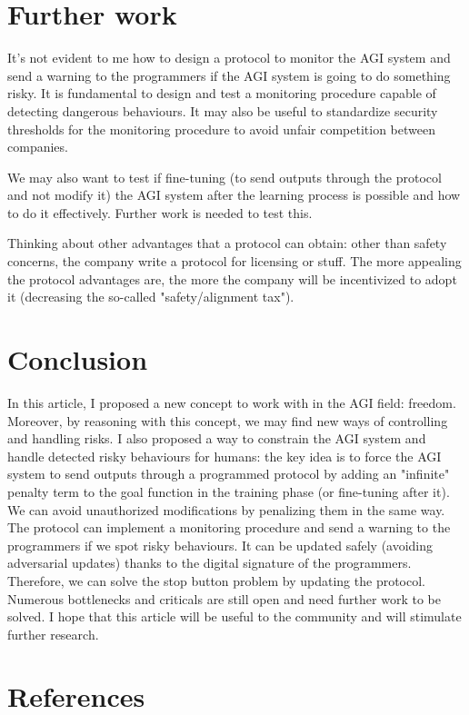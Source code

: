 \documentclass{article}
\begin{document}
\section{Further work}
It's not evident to me how to design a protocol to monitor the AGI system and send a warning to the programmers if the AGI system is going to do something risky. 
It is fundamental to design and test a monitoring procedure capable of detecting dangerous behaviours.
It may also be useful to standardize security thresholds for the monitoring procedure to avoid unfair competition between companies.

We may also want to test if fine-tuning (to send outputs through the protocol and not modify it) the AGI system after the learning process is possible and how to do it effectively. Further work is needed to test this.

Thinking about other advantages that a protocol can obtain: other than safety concerns, the company write a protocol for licensing or stuff. 
The more appealing the protocol advantages are, the more the company will be incentivized to adopt it (decreasing the so-called "safety/alignment tax").

\section{Conclusion}
In this article, I proposed a new concept to work with in the AGI field: freedom. Moreover, by reasoning with this concept, we may find new ways of controlling and handling risks.
I also proposed a way to constrain the AGI system and handle detected risky behaviours for humans: the key idea is to force the AGI system to send outputs through a programmed protocol by adding an "infinite" penalty term to the goal function in the training phase (or fine-tuning after it). 
We can avoid unauthorized modifications by penalizing them in the same way.
The protocol can implement a monitoring procedure and send a warning to the programmers if we spot risky behaviours.
It can be updated safely (avoiding adversarial updates) thanks to the digital signature of the programmers. 
Therefore, we can solve the stop button problem by updating the protocol.
Numerous bottlenecks and criticals are still open and need further work to be solved.
I hope that this article will be useful to the community and will stimulate further research.

\newpage
\section*{References}
    \printbibliography[heading=none]
\end{document}
